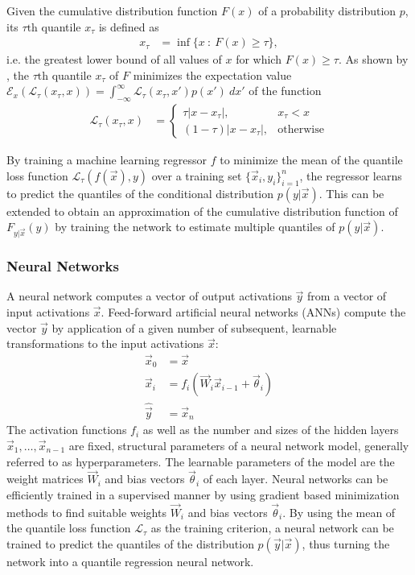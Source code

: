 \documentclass[journal abbreviation, manuscript]{copernicus}
\begin{document}
Given the cumulative distribution function $F(x)$ of a probability distribution
$p$, its $\tau\text{th}$ quantile $x_\tau$ is defined as
\begin{align}
x_\tau &= \inf \{x \: : \: F(x) \geq \tau \},
\end{align}
i.e. the greatest lower bound of all values of $x$ for which $F(x) \geq \tau$.
As shown by \citet{koenker}, the $\tau\text{th}$ quantile $x_\tau$ of $F$
minimizes the expectation value $\mathcal{E}_x\left ( \mathcal{L}_\tau(x_\tau, x) \right) = \int_{-\infty}^\infty \mathcal{L}_\tau(x_\tau, x') p(x') \: dx'$
of the function
\begin{align}\label{eq:quantile_loss}
  \mathcal{L}_{\tau}(x_\tau, x) &=
  \begin{cases}
    \tau |x - x_\tau|, & x_\tau < x \\
    (1 - \tau)|x - x_\tau|, &\text{otherwise}
    \end{cases}
\end{align}

By training a machine learning regressor $f$ to minimize the mean of the quantile loss
function $\mathcal{L}_\tau(f(\vec{x}), y)$ over a training set $\{\vec{x}_i,
y_i\}_{i = 1}^n$, the regressor learns to predict the quantiles of the
conditional distribution $p(y | \vec{x})$. This can be extended to obtain an
approximation of the cumulative distribution function of $F_{y | \vec{x}}(y)$ by
training the network to estimate multiple quantiles of $p(y | \vec{x})$.

\subsubsection{Neural Networks}

A neural network computes a vector of output activations $\vec{y}$ from a vector
of input activations $\vec{x}$. Feed-forward artificial neural networks (ANNs)
compute the vector $\vec{y}$ by application of a given number of subsequent,
learnable transformations to the input activations $\vec{x}$:
\begin{align*}
    \vec{x}_0 &= \vec{x}\\
    \vec{x}_i &= f_{i}
    \left ( \vec{W}_{i} \vec{x}_{i - 1}+ \vec{\theta}_i \right ) \\
    \hat{\vec{y}} &= \vec{x}_{n}
\end{align*}
The activation functions $f_i$ as well as the number and sizes of the hidden
layers $\vec{x}_1, \ldots, \vec{x}_{n-1}$ are fixed, structural parameters of a
neural network model, generally referred to as hyperparameters. The learnable
parameters of the model are the weight matrices $\vec{W}_i$ and bias vectors
$\vec{\theta}_i$ of each layer. Neural networks can be efficiently trained in
a supervised manner by using gradient based minimization methods to find
suitable weights $\vec{W}_i$ and bias vectors $\vec{\theta}_i$. By using the
mean of the quantile loss function $\mathcal{L}_\tau$ as the training criterion,
a neural network can be trained to predict the quantiles of the distribution
$p(\vec{y} | \vec{x})$, thus turning the network into a quantile regression
neural network.
\end{document}
